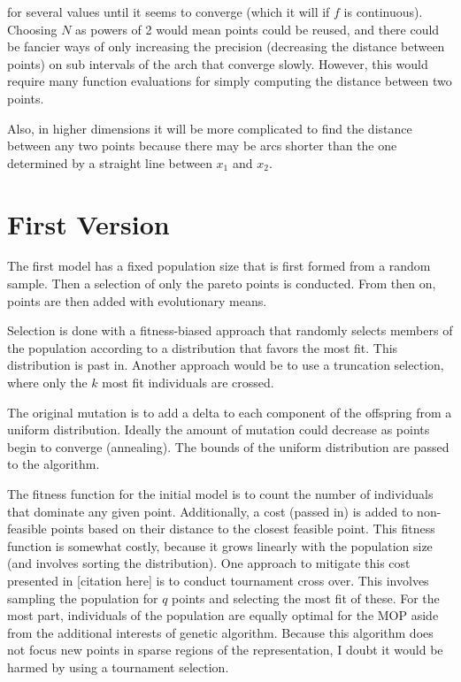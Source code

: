 \documentclass{article}
\begin{document}
for several values until it seems to converge (which it will if $f$ is continuous).
Choosing $N$ as powers of 2 would mean points could be reused, and there could be fancier ways of only increasing the precision (decreasing the distance between points) on sub intervals of the arch that
converge slowly.
However, this would require many function evaluations for simply computing the distance between two points.

Also, in higher dimensions it will be more complicated to find the distance between any two points because there may be arcs shorter than the one determined by a straight line between $x_1$ and $x_2$.


\section{First Version}

The first model has a fixed population size that is first formed from a random sample.
Then a selection of only the pareto points is conducted.
From then on, points are then added with evolutionary means.


Selection is done with a fitness-biased approach that randomly selects members of the population according to a distribution that favors the most fit.
This distribution is past in.
Another approach would be to use a truncation selection, where only the $k$ most fit individuals are crossed.

The original mutation is to add a delta to each component of the offspring from a uniform distribution.
Ideally the amount of mutation could decrease as points begin to converge (annealing).
The bounds of the uniform distribution are passed to the algorithm.

The fitness function for the initial model is to count the number of individuals that dominate any given point.
Additionally, a cost (passed in) is added to non-feasible points based on their distance to the closest feasible point.
This fitness function is somewhat costly, because it grows linearly with the population size (and involves sorting the distribution).
One approach to mitigate this cost presented in [citation here] is to conduct tournament cross over.
This involves sampling the population for $q$ points and selecting the most fit of these.
For the most part, individuals of the population are equally optimal for the MOP aside from the additional interests of genetic algorithm.
Because this algorithm does not focus new points in sparse regions of the representation, I doubt it would be harmed by using a tournament selection.
\end{document}
